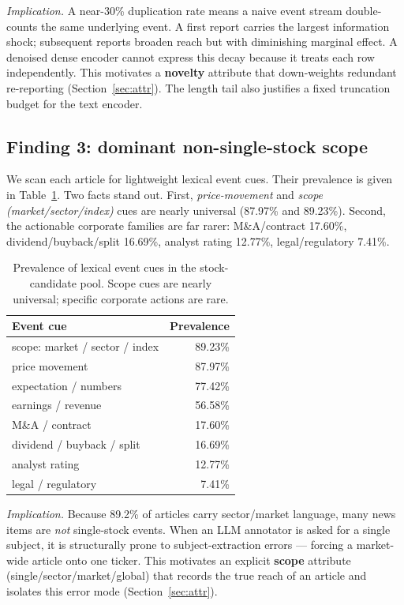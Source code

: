 \documentclass[sigconf,nonacm]{acmart}
\begin{document}
\emph{Implication.} A near-30\% duplication rate means a naive event
stream double-counts the same underlying event. A first report carries
the largest information shock; subsequent reports broaden reach but with
diminishing marginal effect. A denoised dense encoder cannot express this
decay because it treats each row independently. This motivates a
\textbf{novelty} attribute that down-weights redundant re-reporting
(Section~\ref{sec:attr}). The length tail also justifies a fixed
truncation budget for the text encoder.

\subsection{Finding 3: dominant non-single-stock scope}
We scan each article for lightweight lexical event cues. Their prevalence
is given in Table~\ref{tab:cues}. Two facts stand out. First,
\emph{price-movement} and \emph{scope (market/sector/index)} cues are
nearly universal (87.97\% and 89.23\%). Second, the actionable corporate
families are far rarer: M\&A/contract 17.60\%, dividend/buyback/split
16.69\%, analyst rating 12.77\%, legal/regulatory 7.41\%.

\begin{table}[t]
\caption{Prevalence of lexical event cues in the stock-candidate pool.
Scope cues are nearly universal; specific corporate actions are rare.}
\label{tab:cues}
\begin{tabular}{lr}
\toprule
Event cue & Prevalence \\
\midrule
scope: market / sector / index & 89.23\% \\
price movement                 & 87.97\% \\
expectation / numbers           & 77.42\% \\
earnings / revenue              & 56.58\% \\
M\&A / contract                 & 17.60\% \\
dividend / buyback / split      & 16.69\% \\
analyst rating                  & 12.77\% \\
legal / regulatory              & \phantom{0}7.41\% \\
\bottomrule
\end{tabular}
\end{table}

\emph{Implication.} Because 89.2\% of articles carry sector/market
language, many news items are \emph{not} single-stock events. When an LLM
annotator is asked for a single subject, it is structurally prone to
subject-extraction errors --- forcing a market-wide article onto one
ticker. This motivates an explicit \textbf{scope} attribute
(single/sector/market/global) that records the true reach of an article
and isolates this error mode (Section~\ref{sec:attr}).
\end{document}
